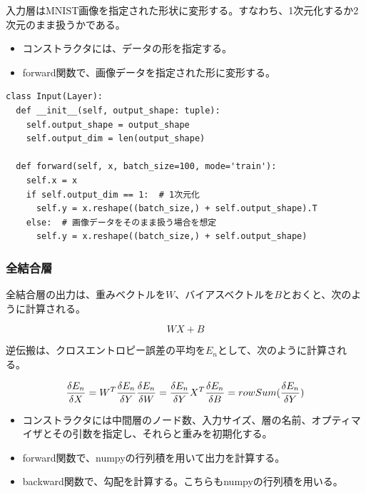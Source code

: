 \documentclass[platex,dvipdfmx]{jsarticle}
\begin{document}
入力層はMNIST画像を指定された形状に変形する。すなわち、1次元化するか2次元のまま扱うかである。

\begin{itemize}
  \item コンストラクタには、データの形を指定する。
  \item forward関数で、画像データを指定された形に変形する。
\end{itemize}

\begin{lstlisting}[caption=ex\_advanced.py, label=Input]
class Input(Layer):
  def __init__(self, output_shape: tuple):
    self.output_shape = output_shape
    self.output_dim = len(output_shape)
  
  def forward(self, x, batch_size=100, mode='train'):
    self.x = x
    if self.output_dim == 1:  # 1次元化
      self.y = x.reshape((batch_size,) + self.output_shape).T
    else:  # 画像データをそのまま扱う場合を想定
      self.y = x.reshape((batch_size,) + self.output_shape)
\end{lstlisting}

\subsubsection{全結合層}

全結合層の出力は、重みベクトルを$W$、バイアスベクトルを$B$とおくと、次のように計算される。

\[
  WX + B
\]

逆伝搬は、クロスエントロピー誤差の平均を$E_n$として、次のように計算される。

\[
  \frac{\delta E_n}{\delta X} = W^T \frac{\delta E_n}{\delta Y} \\
  \frac{\delta E_n}{\delta W} = \frac{\delta E_n}{\delta Y} X^T \\
  \frac{\delta E_n}{\delta B} = rowSum(\frac{\delta E_n}{\delta Y})
\]

\begin{itemize}
  \item コンストラクタには中間層のノード数、入力サイズ、層の名前、オプティマイザとその引数を指定し、それらと重みを初期化する。
  \item forward関数で、numpyの行列積を用いて出力を計算する。
  \item backward関数で、勾配を計算する。こちらもnumpyの行列積を用いる。
\end{itemize}
\end{document}
